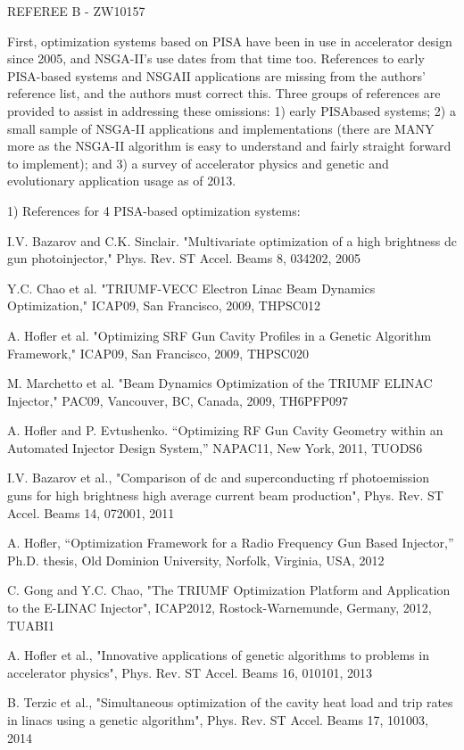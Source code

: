 \documentclass{article}
\begin{document}
REFEREE B - ZW10157

First, optimization systems based on PISA have been in use in
accelerator design since 2005, and NSGA-II’s use dates from that time
too. References to early PISA-based systems and NSGAII applications
are missing from the authors’ reference list, and the authors must
correct this. Three groups of references are provided to assist in
addressing these omissions: 1) early PISAbased systems; 2) a small
sample of NSGA-II applications and implementations (there are MANY
more as the NSGA-II algorithm is easy to understand and fairly
straight forward to implement); and 3) a survey of accelerator physics
and genetic and evolutionary application usage as of 2013.

1) References for 4 PISA-based optimization systems:

I.V. Bazarov and C.K. Sinclair. "Multivariate optimization of a high
brightness dc gun photoinjector," Phys. Rev. ST Accel. Beams 8,
034202, 2005

Y.C. Chao et al. "TRIUMF-VECC Electron Linac Beam Dynamics
Optimization," ICAP09, San Francisco, 2009, THPSC012

A. Hofler et al. "Optimizing SRF Gun Cavity Profiles in a Genetic
Algorithm Framework," ICAP09, San Francisco, 2009, THPSC020

M. Marchetto et al. "Beam Dynamics Optimization of the TRIUMF ELINAC
Injector," PAC09, Vancouver, BC, Canada, 2009, TH6PFP097

A. Hofler and P. Evtushenko. “Optimizing RF Gun Cavity Geometry within
an Automated Injector Design System,” NAPAC11, New York, 2011, TUODS6

I.V. Bazarov et al., "Comparison of dc and superconducting rf
photoemission guns for high brightness high average current beam
production", Phys. Rev. ST Accel. Beams 14, 072001, 2011

A. Hofler, “Optimization Framework for a Radio Frequency Gun Based
Injector,” Ph.D. thesis, Old Dominion University, Norfolk, Virginia,
USA, 2012

C. Gong and Y.C. Chao, "The TRIUMF Optimization Platform and
Application to the E-LINAC Injector", ICAP2012, Rostock-Warnemunde,
Germany, 2012, TUABI1

A. Hofler et al., "Innovative applications of genetic algorithms to
problems in accelerator physics", Phys. Rev. ST Accel. Beams 16,
010101, 2013

B. Terzic et al., "Simultaneous optimization of the cavity heat load
and trip rates in linacs using a genetic algorithm", Phys. Rev. ST
Accel. Beams 17, 101003, 2014
\end{document}
